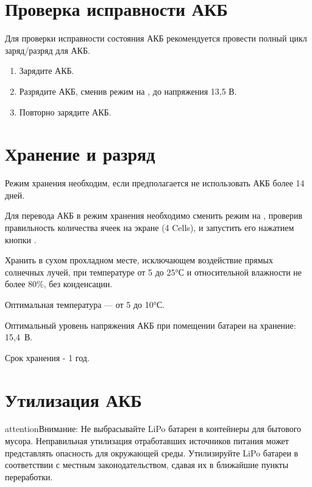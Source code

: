 \documentclass[a4paper,10pt,russian,openany]{sphinxmanual}
\begin{document}
\section{Проверка исправности АКБ}
\label{\detokenize{charger:id5}}
Для проверки исправности состояния АКБ рекомендуется провести полный цикл заряд/разряд для АКБ.
\begin{enumerate}
\def\theenumi{\arabic{enumi}}
\def\labelenumi{\theenumi )}
\makeatletter\def\p@enumii{\p@enumi \theenumi )}\makeatother
\item {} 
Зарядите АКБ.

\item {} 
Разрядите АКБ, сменив режим на , до напряжения 13,5 В.

\item {} 
Повторно зарядите АКБ.

\end{enumerate}


\section{Хранение и разряд}
\label{\detokenize{charger:id6}}
Режим хранения необходим, если предполагается не использовать АКБ более 14 дней.

Для перевода АКБ в режим хранения необходимо сменить режим  на , проверив правильность количества ячеек на экране (4 Cells), и запустить его нажатием кнопки .

Хранить в сухом прохладном месте, исключающем воздействие прямых солнечных лучей, при температуре от 5 до 25°С и относительной влажности не более 80\%, без конденсации.

Оптимальная температура — от 5 до 10°С.

Оптимальный уровень напряжения АКБ при помещении батареи на хранение: 15,4 В.

Срок хранения - 1 год.


\section{Утилизация АКБ}
\label{\detokenize{charger:id7}}
\begin{sphinxadmonition}{attention}{Внимание:}
Не выбрасывайте LiPo батареи в контейнеры для бытового мусора.
Неправильная утилизация отработавших источников питания может представлять опасность для окружающей среды.
Утилизируйте LiPo батареи в соответствии с местным законодательством, сдавая их в ближайшие пункты переработки.
\end{sphinxadmonition}
\end{document}
